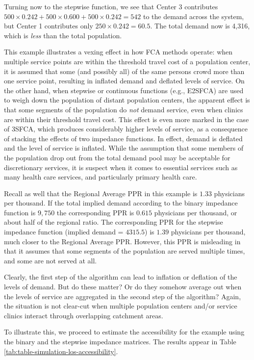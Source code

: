 \documentclass[10pt,letterpaper]{article}
\begin{document}
Turning now to the stepwise function, we see that Center 3 contributes
\(500 \times 0.242 + 500 \times 0.600 + 500 \times 0.242 = 542\) to the
demand across the system, but Center 1 contributes only
\(250 \times 0.242= 60.5\). The total demand now is 4,316, which is
\emph{less} than the total population.

This example illustrates a vexing effect in how FCA methods operate:
when multiple service points are within the threshold travel cost of a
population center, it is assumed that some (and possibly all) of the
same persons crowd more than one service point, resulting in inflated
demand and deflated levels of service. On the other hand, when stepwise
or continuous functions (e.g., E2SFCA) are used to weigh down the
population of distant population centers, the apparent effect is that
some segments of the population do \emph{not} demand service, even when
clinics are within their threshold travel cost. This effect is even more
marked in the case of 3SFCA, which produces considerably higher levels
of service, as a consequence of stacking the effects of two impedance
functions. In effect, demand is deflated and the level of service is
inflated. While the assumption that some members of the population drop
out from the total demand pool may be acceptable for discretionary
services, it is suspect when it comes to essential services such as many
health care services, and particularly primary health care.

Recall as well that the Regional Average PPR in this example is \(1.33\)
physicians per thousand. If the total implied demand according to the
binary impedance function is \(9,750\) the corresponding PPR is
\(0.615\) physicians per thousand, or about half of the regional ratio.
The corresponding PPR for the stepwise impedance function (implied
demand = \(4315.5\)) is \(1.39\) physicians per thousand, much closer to
the Regional Average PPR. However, this PPR is misleading in that it
assumes that some segments of the population are served multiple times,
and some are not served at all.

Clearly, the first step of the algorithm can lead to inflation or
deflation of the levels of demand. But do these matter? Or do they
somehow average out when the levels of service are aggregated in the
second step of the algorithm? Again, the situation is not clear-cut when
multiple population centers and/or service clinics interact through
overlapping catchment areas.

To illustrate this, we proceed to estimate the accessibility for the
example using the binary and the stepwise impedance matrices. The
results appear in Table \ref{tab:table-simulation-los-accessibility}.
\end{document}
